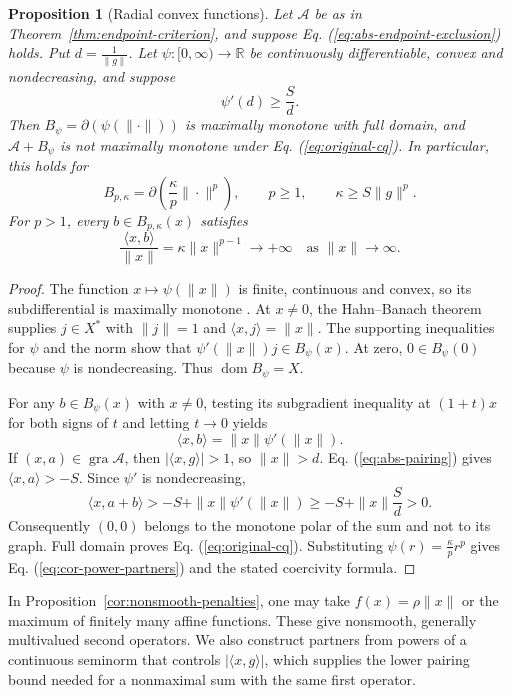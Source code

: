 \documentclass[11pt]{article}
\newcommand{\R}{\mathbb R}
\newcommand{\gra}{\operatorname{gra}}
\newcommand{\dom}{\operatorname{dom}}
\newcommand{\pair}[2]{\langle #1,#2\rangle}
\newtheorem{proposition}{Proposition}
\theoremstyle{definition}
\theoremstyle{remark}
\begin{document}
\begin{proposition}[Radial convex functions]
\label{cor:radial-partners}
Let $\mathcal A$ be as in Theorem~\ref{thm:endpoint-criterion}, and suppose Eq. (\ref{eq:abs-endpoint-exclusion}) holds. Put $d=\frac1{\|g\|}$. Let $\psi:[0,\infty)\to\R$ be continuously differentiable, convex and nondecreasing, and suppose
\[
\psi'(d)\ge\frac{S}{d}.
\]
Then $B_\psi=\partial(\psi(\|\cdot\|))$ is maximally monotone with full domain, and $\mathcal A+B_\psi$ is not maximally monotone under Eq. (\ref{eq:original-cq}). In particular, this holds for
\begin{equation}
B_{p,\kappa}=\partial\left(\frac{\kappa}{p}\|\cdot\|^p\right),
\qquad p\ge1,\qquad \kappa\ge S\|g\|^p.
\label{eq:cor-power-partners}
\end{equation}
For $p>1$, every $b\in B_{p,\kappa}(x)$ satisfies
\[
\frac{\pair{x}{b}}{\|x\|}=\kappa\|x\|^{p-1}\longrightarrow+\infty
\quad\text{as }\|x\|\to\infty.
\]
\end{proposition}
\begin{proof}
The function $x\mapsto\psi(\|x\|)$ is finite, continuous and convex, so its subdifferential is maximally monotone \cite{rockafellar1970subdiff}. At $x\ne0$, the Hahn--Banach theorem supplies $j\in X^*$ with $\|j\|=1$ and $\pair{x}{j}=\|x\|$. The supporting inequalities for $\psi$ and the norm show that $\psi'(\|x\|)j\in B_\psi(x)$. At zero, $0\in B_\psi(0)$ because $\psi$ is nondecreasing. Thus $\dom B_\psi=X$.

For any $b\in B_\psi(x)$ with $x\ne0$, testing its subgradient inequality at $(1+t)x$ for both signs of $t$ and letting $t\to0$ yields
\[
\pair{x}{b}=\|x\|\psi'(\|x\|).
\]
If $(x,a)\in\gra\mathcal A$, then $|\pair{x}{g}|>1$, so $\|x\|>d$. Eq. (\ref{eq:abs-pairing}) gives $\pair{x}{a}>-S$. Since $\psi'$ is nondecreasing,
\[
\pair{x}{a+b}>-S+\|x\|\psi'(\|x\|)
\ge-S+\|x\|\frac{S}{d}>0.
\]
Consequently $(0,0)$ belongs to the monotone polar of the sum and not to its graph. Full domain proves Eq. (\ref{eq:original-cq}). Substituting $\psi(r)=\frac{\kappa}{p}r^p$ gives Eq. (\ref{eq:cor-power-partners}) and the stated coercivity formula.
\end{proof}

In Proposition~\ref{cor:nonsmooth-penalties}, one may take $f(x)=\rho\|x\|$ or the maximum of finitely many affine functions. These give nonsmooth, generally multivalued second operators. We also construct partners from powers of a continuous seminorm that controls $|\pair{x}{g}|$, which supplies the lower pairing bound needed for a nonmaximal sum with the same first operator.
\end{document}
